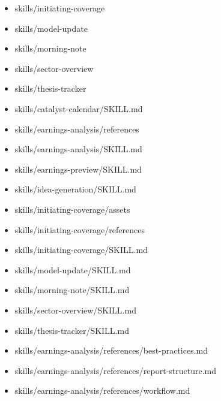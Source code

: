 \documentclass[11pt]{article}
\begin{document}
\begin{itemize}[leftmargin=*,itemsep=1pt,topsep=2pt]
\item \hspace*{0.9em}skills/initiating-coverage
\item \hspace*{0.9em}skills/model-update
\item \hspace*{0.9em}skills/morning-note
\item \hspace*{0.9em}skills/sector-overview
\item \hspace*{0.9em}skills/thesis-tracker
\item \hspace*{1.8em}skills/catalyst-calendar/SKILL.md
\item \hspace*{1.8em}skills/earnings-analysis/references
\item \hspace*{1.8em}skills/earnings-analysis/SKILL.md
\item \hspace*{1.8em}skills/earnings-preview/SKILL.md
\item \hspace*{1.8em}skills/idea-generation/SKILL.md
\item \hspace*{1.8em}skills/initiating-coverage/assets
\item \hspace*{1.8em}skills/initiating-coverage/references
\item \hspace*{1.8em}skills/initiating-coverage/SKILL.md
\item \hspace*{1.8em}skills/model-update/SKILL.md
\item \hspace*{1.8em}skills/morning-note/SKILL.md
\item \hspace*{1.8em}skills/sector-overview/SKILL.md
\item \hspace*{1.8em}skills/thesis-tracker/SKILL.md
\item \hspace*{2.7em}skills/earnings-analysis/references/best-practices.md
\item \hspace*{2.7em}skills/earnings-analysis/references/report-structure.md
\item \hspace*{2.7em}skills/earnings-analysis/references/workflow.md

\end{itemize}
\end{document}
